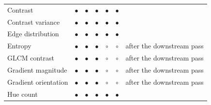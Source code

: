 \begin{table}[!ht]
\begin{tabular}{@{}l ccccc >{\raggedright\arraybackslash}p{3.2cm}@{}}
Contrast & \textcolor{accentgreen!70!black}{\textbf{$\bullet$}} & \textcolor{accentgreen!70!black}{\textbf{$\bullet$}} & \textcolor{accentgreen!70!black}{\textbf{$\bullet$}} & \textcolor{accentgreen!70!black}{\textbf{$\bullet$}} & \textcolor{accentgreen!70!black}{\textbf{$\bullet$}} & \textcolor{black!55}{\scriptsize } \\
\rowcolor{rowlight}Contrast variance & \textcolor{accentgreen!70!black}{\textbf{$\bullet$}} & \textcolor{accentgreen!70!black}{\textbf{$\bullet$}} & \textcolor{accentgreen!70!black}{\textbf{$\bullet$}} & \textcolor{accentgreen!70!black}{\textbf{$\bullet$}} & \textcolor{accentgreen!70!black}{\textbf{$\bullet$}} & \textcolor{black!55}{\scriptsize } \\
Edge distribution & \textcolor{accentgreen!70!black}{\textbf{$\bullet$}} & \textcolor{accentgreen!70!black}{\textbf{$\bullet$}} & \textcolor{accentgreen!70!black}{\textbf{$\bullet$}} & \textcolor{accentgreen!70!black}{\textbf{$\bullet$}} & \textcolor{accentgreen!70!black}{\textbf{$\bullet$}} & \textcolor{black!55}{\scriptsize } \\
\rowcolor{rowlight}Entropy & \textcolor{accentgreen!70!black}{\textbf{$\bullet$}} & \textcolor{accentgreen!70!black}{\textbf{$\bullet$}} & \textcolor{accentgreen!70!black}{\textbf{$\bullet$}} & \textcolor{black!28}{$\circ$} & \textcolor{black!28}{$\circ$} & \textcolor{black!55}{\scriptsize after the downstream pass} \\
GLCM contrast & \textcolor{accentgreen!70!black}{\textbf{$\bullet$}} & \textcolor{accentgreen!70!black}{\textbf{$\bullet$}} & \textcolor{accentgreen!70!black}{\textbf{$\bullet$}} & \textcolor{black!28}{$\circ$} & \textcolor{black!28}{$\circ$} & \textcolor{black!55}{\scriptsize after the downstream pass} \\
\rowcolor{rowlight}Gradient magnitude & \textcolor{accentgreen!70!black}{\textbf{$\bullet$}} & \textcolor{accentgreen!70!black}{\textbf{$\bullet$}} & \textcolor{accentgreen!70!black}{\textbf{$\bullet$}} & \textcolor{black!28}{$\circ$} & \textcolor{black!28}{$\circ$} & \textcolor{black!55}{\scriptsize after the downstream pass} \\
Gradient orientation & \textcolor{accentgreen!70!black}{\textbf{$\bullet$}} & \textcolor{accentgreen!70!black}{\textbf{$\bullet$}} & \textcolor{accentgreen!70!black}{\textbf{$\bullet$}} & \textcolor{black!28}{$\circ$} & \textcolor{black!28}{$\circ$} & \textcolor{black!55}{\scriptsize after the downstream pass} \\
\rowcolor{rowlight}Hue count & \textcolor{accentgreen!70!black}{\textbf{$\bullet$}} & \textcolor{accentgreen!70!black}{\textbf{$\bullet$}} & \textcolor{accentgreen!70!black}{\textbf{$\bullet$}} & \textcolor{accentgreen!70!black}{\textbf{$\bullet$}} & \textcolor{accentgreen!70!black}{\textbf{$\bullet$}} & \textcolor{black!55}{\scriptsize } \\

\end{tabular}
\end{table}
